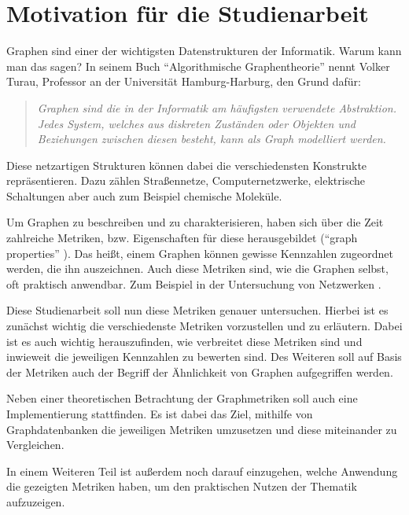 \documentclass[a4paper,12pt,ngerman,chapterprefix=false,listof=totoc,bibliography=totoc]{scrreprt}
\newcommand{\zitat}[2]{
	\begin{quote}
		\textit{#1} \cite{#2}
	\end{quote}
}
\begin{document}
\section{Motivation für die Studienarbeit}{
Graphen sind einer der wichtigsten Datenstrukturen der Informatik. Warum kann man das sagen? In seinem Buch "`Algorithmische Graphentheorie"' nennt Volker Turau, Professor an der Universität Hamburg-Harburg, den Grund dafür: 
\zitat{Graphen sind die in der Informatik am häufigsten verwendete Abstraktion. Jedes System, welches aus diskreten Zuständen oder Objekten und Beziehungen zwischen diesen besteht, kann als Graph modelliert werden.}{turau_algorithmische_2004}
Diese netzartigen Strukturen können dabei die verschiedensten Konstrukte repräsentieren. Dazu zählen Straßennetze, Computernetzwerke, elektrische Schaltungen aber auch zum Beispiel chemische Moleküle. \cite{tittmann_graphentheorie_2019}

Um Graphen zu beschreiben und zu charakterisieren, haben sich über die Zeit zahlreiche Metriken, bzw. Eigenschaften für diese herausgebildet ("`graph properties"' \cite{lovasz_large_2012}). Das heißt, einem Graphen können gewisse Kennzahlen zugeordnet werden, die ihn auszeichnen. Auch diese Metriken sind, wie die Graphen selbst, oft praktisch anwendbar. Zum Beispiel in der Untersuchung von Netzwerken \cite{ellens_graph_2013}.

Diese Studienarbeit soll nun diese Metriken genauer untersuchen. Hierbei ist es zunächst wichtig die verschiedenste Metriken vorzustellen und zu erläutern. Dabei ist es auch wichtig herauszufinden, wie verbreitet diese Metriken sind und inwieweit die jeweiligen Kennzahlen zu bewerten sind. Des Weiteren soll auf Basis der Metriken auch der Begriff der Ähnlichkeit von Graphen aufgegriffen werden.

Neben einer theoretischen Betrachtung der Graphmetriken soll auch eine Implementierung stattfinden. Es ist dabei das Ziel, mithilfe von Graphdatenbanken die jeweiligen Metriken umzusetzen und diese miteinander zu Vergleichen.

In einem Weiteren Teil ist außerdem noch darauf einzugehen, welche Anwendung die gezeigten Metriken haben, um den praktischen Nutzen der Thematik aufzuzeigen.
}
\end{document}
